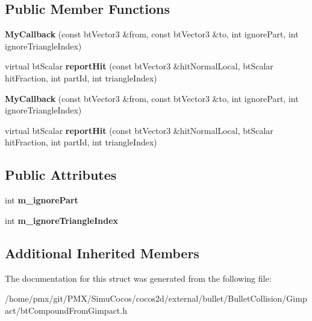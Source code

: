 \subsection*{Public Member Functions}
\begin{DoxyCompactItemize}
\item 
\mbox{\label{structMyCallback_ab9d97084f47d3026dd1766fb4ec9ad58}} 
{\bfseries My\+Callback} (const bt\+Vector3 \&from, const bt\+Vector3 \&to, int ignore\+Part, int ignore\+Triangle\+Index)
\item 
\mbox{\label{structMyCallback_a5ead749dfaf05abb42e2090254939dc7}} 
virtual bt\+Scalar {\bfseries report\+Hit} (const bt\+Vector3 \&hit\+Normal\+Local, bt\+Scalar hit\+Fraction, int part\+Id, int triangle\+Index)
\item 
\mbox{\label{structMyCallback_ab9d97084f47d3026dd1766fb4ec9ad58}} 
{\bfseries My\+Callback} (const bt\+Vector3 \&from, const bt\+Vector3 \&to, int ignore\+Part, int ignore\+Triangle\+Index)
\item 
\mbox{\label{structMyCallback_a5ead749dfaf05abb42e2090254939dc7}} 
virtual bt\+Scalar {\bfseries report\+Hit} (const bt\+Vector3 \&hit\+Normal\+Local, bt\+Scalar hit\+Fraction, int part\+Id, int triangle\+Index)
\end{DoxyCompactItemize}
\subsection*{Public Attributes}
\begin{DoxyCompactItemize}
\item 
\mbox{\label{structMyCallback_a5651126c041fa126b964f67b54aef78a}} 
int {\bfseries m\+\_\+ignore\+Part}
\item 
\mbox{\label{structMyCallback_a3a9d909cd9022554bcaa12cb6de45aae}} 
int {\bfseries m\+\_\+ignore\+Triangle\+Index}
\end{DoxyCompactItemize}
\subsection*{Additional Inherited Members}


The documentation for this struct was generated from the following file\+:\begin{DoxyCompactItemize}
\item 
/home/pmx/git/\+P\+M\+X/\+Simu\+Cocos/cocos2d/external/bullet/\+Bullet\+Collision/\+Gimpact/bt\+Compound\+From\+Gimpact.\+h\end{DoxyCompactItemize}
